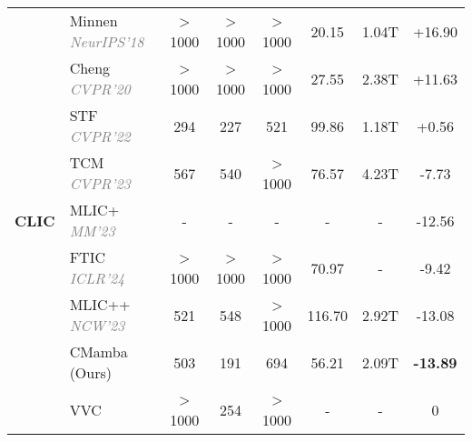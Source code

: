 \begin{table*}[t]
\begin{tabular}{clcccccc}
\multicolumn{1}{c}{\multirow{9}{*}{\textbf{CLIC}}}  & Minnen~\cite{minnen2018joint} \textcolor{gray}{\textit{NeurIPS'18}}& \textgreater{} 1000 &  \textgreater{} 1000 & \textgreater{} 1000 & 20.15 & 1.04T & \cellcolor[HTML]{EFEFEF} +16.90 \\
\multicolumn{1}{c}{}  & Cheng~\cite{cheng2020learned} \textcolor{gray}{\textit{CVPR'20}}& \textgreater{} 1000 & \textgreater{} 1000 & \textgreater{} 1000 &  27.55  &  2.38T  & \cellcolor[HTML]{EFEFEF} +11.63 \\
\multicolumn{1}{c}{}  & STF~\cite{zou2022devil} \textcolor{gray}{\textit{CVPR'22}}   & 294 &  227 & 521 &  99.86     & 1.18T & \cellcolor[HTML]{EFEFEF} +0.56 \\
\multicolumn{1}{c}{}  & TCM~\cite{liu2023learned} \textcolor{gray}{\textit{CVPR'23}} & 567 &  540 & \textgreater{} 1000 &  76.57& 4.23T & \cellcolor[HTML]{EFEFEF} -7.73 \\
\multicolumn{1}{c}{}  & MLIC+~\cite{jiang2023mlic} \textcolor{gray}{\textit{MM'23}}      & - & - & - & - & - & \cellcolor[HTML]{EFEFEF} -12.56 \\
\multicolumn{1}{c}{}  & FTIC~\cite{li2024frequency} \textcolor{gray}{\textit{ICLR'24}}   & \textgreater{} 1000 & \textgreater{} 1000 & \textgreater{} 1000 &    70.97&  -  & \cellcolor[HTML]{EFEFEF} -9.42 \\
\multicolumn{1}{c}{}  & MLIC++~\cite{jiang2023mlicpp} \textcolor{gray}{\textit{NCW'23}}  & 521 & 548 & \textgreater{} 1000 &  116.70& 2.92T & \cellcolor[HTML]{EFEFEF} -13.08 \\
\multicolumn{1}{c}{}  & CMamba (Ours)  & 503 & 191 & 694 & 56.21 & 2.09T &  \cellcolor[HTML]{EFEFEF} \textbf{-13.89} \\ \cmidrule{2-8}
\multicolumn{1}{c}{}  & VVC   & \textgreater{} 1000 & 254 & \textgreater{} 1000 & -    & - & \cellcolor[HTML]{EFEFEF} 0     \\ 
\bottomrule
\end{tabular}
\label{tab1}
\end{table*}